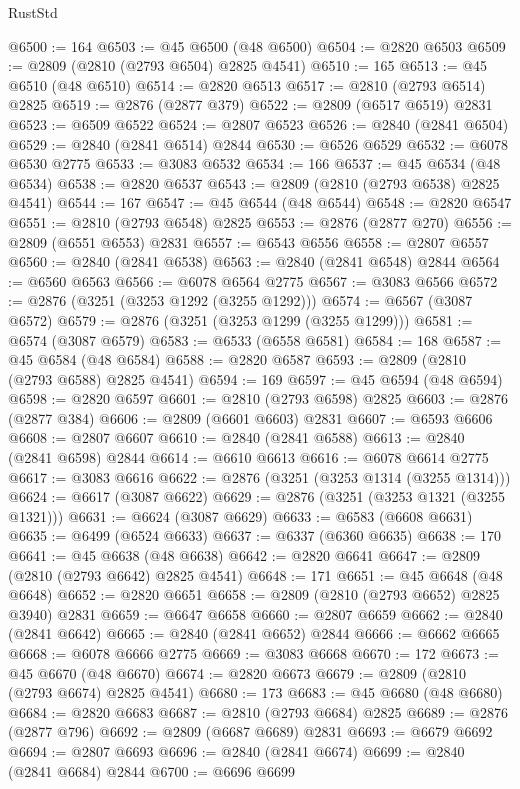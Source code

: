 \begin{lexlean}{RustStd}
\begin{coremodule}
@6500 := 164
@6503 := @45 @6500 (@48 @6500)
@6504 := @2820 @6503
@6509 := @2809 (@2810 (@2793 @6504) @2825 @4541)
@6510 := 165
@6513 := @45 @6510 (@48 @6510)
@6514 := @2820 @6513
@6517 := @2810 (@2793 @6514) @2825
@6519 := @2876 (@2877 @379)
@6522 := @2809 (@6517 @6519) @2831
@6523 := @6509 @6522
@6524 := @2807 @6523
@6526 := @2840 (@2841 @6504)
@6529 := @2840 (@2841 @6514) @2844
@6530 := @6526 @6529
@6532 := @6078 @6530 @2775
@6533 := @3083 @6532
@6534 := 166
@6537 := @45 @6534 (@48 @6534)
@6538 := @2820 @6537
@6543 := @2809 (@2810 (@2793 @6538) @2825 @4541)
@6544 := 167
@6547 := @45 @6544 (@48 @6544)
@6548 := @2820 @6547
@6551 := @2810 (@2793 @6548) @2825
@6553 := @2876 (@2877 @270)
@6556 := @2809 (@6551 @6553) @2831
@6557 := @6543 @6556
@6558 := @2807 @6557
@6560 := @2840 (@2841 @6538)
@6563 := @2840 (@2841 @6548) @2844
@6564 := @6560 @6563
@6566 := @6078 @6564 @2775
@6567 := @3083 @6566
@6572 := @2876 (@3251 (@3253 @1292 (@3255 @1292)))
@6574 := @6567 (@3087 @6572)
@6579 := @2876 (@3251 (@3253 @1299 (@3255 @1299)))
@6581 := @6574 (@3087 @6579)
@6583 := @6533 (@6558 @6581)
@6584 := 168
@6587 := @45 @6584 (@48 @6584)
@6588 := @2820 @6587
@6593 := @2809 (@2810 (@2793 @6588) @2825 @4541)
@6594 := 169
@6597 := @45 @6594 (@48 @6594)
@6598 := @2820 @6597
@6601 := @2810 (@2793 @6598) @2825
@6603 := @2876 (@2877 @384)
@6606 := @2809 (@6601 @6603) @2831
@6607 := @6593 @6606
@6608 := @2807 @6607
@6610 := @2840 (@2841 @6588)
@6613 := @2840 (@2841 @6598) @2844
@6614 := @6610 @6613
@6616 := @6078 @6614 @2775
@6617 := @3083 @6616
@6622 := @2876 (@3251 (@3253 @1314 (@3255 @1314)))
@6624 := @6617 (@3087 @6622)
@6629 := @2876 (@3251 (@3253 @1321 (@3255 @1321)))
@6631 := @6624 (@3087 @6629)
@6633 := @6583 (@6608 @6631)
@6635 := @6499 (@6524 @6633)
@6637 := @6337 (@6360 @6635)
@6638 := 170
@6641 := @45 @6638 (@48 @6638)
@6642 := @2820 @6641
@6647 := @2809 (@2810 (@2793 @6642) @2825 @4541)
@6648 := 171
@6651 := @45 @6648 (@48 @6648)
@6652 := @2820 @6651
@6658 := @2809 (@2810 (@2793 @6652) @2825 @3940) @2831
@6659 := @6647 @6658
@6660 := @2807 @6659
@6662 := @2840 (@2841 @6642)
@6665 := @2840 (@2841 @6652) @2844
@6666 := @6662 @6665
@6668 := @6078 @6666 @2775
@6669 := @3083 @6668
@6670 := 172
@6673 := @45 @6670 (@48 @6670)
@6674 := @2820 @6673
@6679 := @2809 (@2810 (@2793 @6674) @2825 @4541)
@6680 := 173
@6683 := @45 @6680 (@48 @6680)
@6684 := @2820 @6683
@6687 := @2810 (@2793 @6684) @2825
@6689 := @2876 (@2877 @796)
@6692 := @2809 (@6687 @6689) @2831
@6693 := @6679 @6692
@6694 := @2807 @6693
@6696 := @2840 (@2841 @6674)
@6699 := @2840 (@2841 @6684) @2844
@6700 := @6696 @6699

\end{coremodule}
\end{lexlean}
